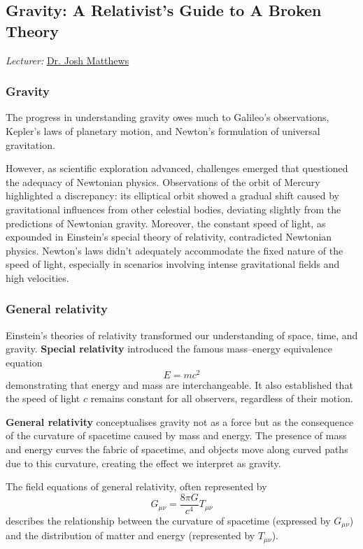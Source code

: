\documentclass[12pt,a4paper]{article}
\begin{document}
\subsection{Gravity: A Relativist's Guide to A Broken Theory}
{\color{red}\textit{Lecturer:}} \href{https://sg.linkedin.com/in/josh-mathews-190901116}{Dr. Josh Matthews}

\subsubsection{Gravity}
The progress in understanding gravity owes much to Galileo's observations, Kepler's laws of planetary motion, and Newton's formulation of universal gravitation.

However, as scientific exploration advanced, challenges emerged that questioned the adequacy of Newtonian physics. Observations of the orbit of Mercury highlighted a discrepancy: its elliptical orbit showed a gradual shift caused by gravitational influences from other celestial bodies, deviating slightly from the predictions of Newtonian gravity. Moreover, the constant speed of light, as expounded in Einstein's special theory of relativity, contradicted Newtonian physics. Newton's laws didn't adequately accommodate the fixed nature of the speed of light, especially in scenarios involving intense gravitational fields and high velocities.

\subsubsection{General relativity}
Einstein's theories of relativity transformed our understanding of space, time, and gravity. \textbf{Special relativity} introduced the famous mass--energy equivalence equation
\begin{equation}
E=mc^2
\end{equation}
demonstrating that energy and mass are interchangeable. It also established that the speed of light $c$ remains constant for all observers, regardless of their motion.

\textbf{General relativity} conceptualises gravity not as a force but as the consequence of the curvature of spacetime caused by mass and energy. The presence of mass and energy curves the fabric of spacetime, and objects move along curved paths due to this curvature, creating the effect we interpret as gravity.

The field equations of general relativity, often represented by
\begin{equation}
G_{\mu\nu} = \frac{8\pi G}{c^4}T_{\mu\nu}
\end{equation}
describes the relationship between the curvature of spacetime (expressed by $G_{\mu\nu}$) and the distribution of matter and energy (represented by $T_{\mu\nu}$).
\end{document}
